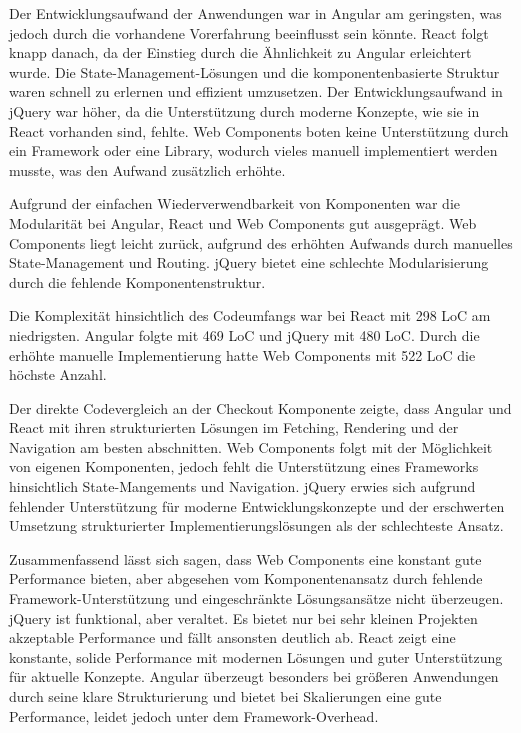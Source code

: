 \documentclass[oneside]{ausarbeitung}
\begin{document}
Der Entwicklungsaufwand der Anwendungen war in Angular am geringsten, was jedoch durch die vorhandene Vorerfahrung beeinflusst sein könnte. React folgt knapp danach, da der Einstieg durch die Ähnlichkeit zu Angular erleichtert wurde. Die State-Management-Lösungen und die komponentenbasierte Struktur waren schnell zu erlernen und effizient umzusetzen. Der Entwicklungsaufwand in jQuery war höher, da die Unterstützung durch moderne Konzepte, wie sie in React vorhanden sind, fehlte. Web Components boten keine Unterstützung durch ein Framework oder eine Library, wodurch vieles manuell implementiert werden musste, was den Aufwand zusätzlich erhöhte.

Aufgrund der einfachen Wiederverwendbarkeit von Komponenten war die Modularität bei Angular, React und Web Components gut ausgeprägt. Web Components liegt leicht zurück, aufgrund des erhöhten Aufwands durch manuelles State-Management und Routing. jQuery bietet eine schlechte Modularisierung durch die fehlende Komponentenstruktur.

Die Komplexität hinsichtlich des Codeumfangs war bei React mit 298 LoC am niedrigsten. Angular folgte mit 469 LoC und jQuery mit 480 LoC. Durch die erhöhte manuelle Implementierung hatte Web Components mit 522 LoC die höchste Anzahl.

Der direkte Codevergleich an der Checkout Komponente zeigte, dass Angular und React mit ihren strukturierten Lösungen im Fetching, Rendering und der Navigation am besten abschnitten. Web Components folgt mit der Möglichkeit von eigenen Komponenten, jedoch fehlt die Unterstützung eines Frameworks hinsichtlich State-Mangements und Navigation. jQuery erwies sich aufgrund fehlender Unterstützung für moderne Entwicklungskonzepte und der erschwerten Umsetzung strukturierter Implementierungslösungen als der schlechteste Ansatz.

Zusammenfassend lässt sich sagen, dass Web Components eine konstant gute Performance bieten, aber abgesehen vom Komponentenansatz durch fehlende Framework-Unterstützung und eingeschränkte Lösungsansätze nicht überzeugen. jQuery ist funktional, aber veraltet. Es bietet nur bei sehr kleinen Projekten akzeptable Performance und fällt ansonsten deutlich ab. React zeigt eine konstante, solide Performance mit modernen Lösungen und guter Unterstützung für aktuelle Konzepte. Angular überzeugt besonders bei größeren Anwendungen durch seine klare Strukturierung und bietet bei Skalierungen eine gute Performance, leidet jedoch unter dem Framework-Overhead.
\end{document}
